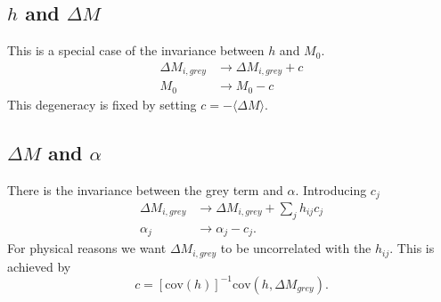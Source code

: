 \documentclass[11pt, oneside]{article}   	%
\begin{document}
\subsection{$h$ and $\Delta M$}
This is a special case of the  invariance  between $h$ and $M_0$.
\begin{align*}
 \Delta M_{i, grey} &\rightarrow  \Delta M_{i, grey} + c\\
 M_0 & \rightarrow  M_0 - c
\end{align*}
This degeneracy is fixed by setting $c = -\langle \Delta M \rangle$.

\subsection{$\Delta M$ and $\alpha$}
There is the invariance  between the grey term and $\alpha$.  Introducing $c_j$
\begin{align*}
 \Delta M_{i, grey} &\rightarrow \Delta M_{i, grey}  + \sum_j h_{ij} c_j  \\
 \alpha_j  & \rightarrow  \alpha_j  - c_j.
\end{align*}
For physical reasons we want $\Delta M_{i, grey}$ to be uncorrelated with the $h_{ij}$.
This is achieved by 
\begin{equation}
c = [\text{cov}(h)]^{-1} \text{cov}(h,\Delta M_{grey}).
\end{equation}
\end{document}
